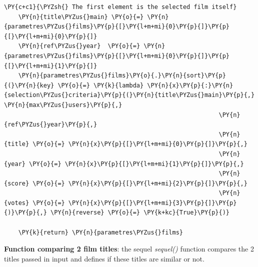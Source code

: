 \begin{tcolorbox}[breakable, size=fbox, boxrule=1pt, pad at break*=1mm,colback=cellbackground, colframe=cellborder]
\begin{Verbatim}[commandchars=\\\{\}]
    \PY{c+c1}{\PYZsh{} The first element is the selected film itself}
    \PY{n}{title\PYZus{}main} \PY{o}{=} \PY{n}{parametres\PYZus{}films}\PY{p}{[}\PY{l+m+mi}{0}\PY{p}{]}\PY{p}{[}\PY{l+m+mi}{0}\PY{p}{]}
    \PY{n}{ref\PYZus{}year}  \PY{o}{=} \PY{n}{parametres\PYZus{}films}\PY{p}{[}\PY{l+m+mi}{0}\PY{p}{]}\PY{p}{[}\PY{l+m+mi}{1}\PY{p}{]}
    \PY{n}{parametres\PYZus{}films}\PY{o}{.}\PY{n}{sort}\PY{p}{(}\PY{n}{key} \PY{o}{=} \PY{k}{lambda} \PY{n}{x}\PY{p}{:}\PY{n}{selection\PYZus{}criteria}\PY{p}{(}\PY{n}{title\PYZus{}main}\PY{p}{,} \PY{n}{max\PYZus{}users}\PY{p}{,}
                                                            \PY{n}{ref\PYZus{}year}\PY{p}{,} 
                                                            \PY{n}{title} \PY{o}{=} \PY{n}{x}\PY{p}{[}\PY{l+m+mi}{0}\PY{p}{]}\PY{p}{,} 
                                                            \PY{n}{year} \PY{o}{=} \PY{n}{x}\PY{p}{[}\PY{l+m+mi}{1}\PY{p}{]}\PY{p}{,}
                                                            \PY{n}{score} \PY{o}{=} \PY{n}{x}\PY{p}{[}\PY{l+m+mi}{2}\PY{p}{]}\PY{p}{,} 
                                                            \PY{n}{votes} \PY{o}{=} \PY{n}{x}\PY{p}{[}\PY{l+m+mi}{3}\PY{p}{]}\PY{p}{)}\PY{p}{,} \PY{n}{reverse} \PY{o}{=} \PY{k+kc}{True}\PY{p}{)}
    
    \PY{k}{return} \PY{n}{parametres\PYZus{}films} 
\end{Verbatim}
\end{tcolorbox}

    \textbf{Function comparing 2 film titles}: the sequel \emph{sequel()}
function compares the 2 titles passed in input and defines if these
titles are similar or not.


